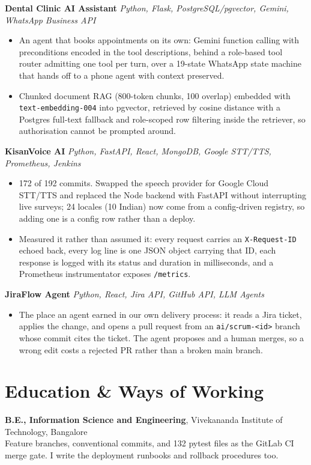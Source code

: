 \documentclass[10pt,a4paper]{article}
\begin{document}
\vspace{1pt}
\textbf{Dental Clinic AI Assistant} \textit{Python, Flask, PostgreSQL/pgvector, Gemini, WhatsApp Business API}
\begin{itemize}
  \item An agent that books appointments on its own: Gemini function calling with preconditions
        encoded in the tool descriptions, behind a role-based tool router admitting one tool per turn,
        over a 19-state WhatsApp state machine that hands off to a phone agent with context preserved.
  \item Chunked document RAG (800-token chunks, 100 overlap) embedded with
        \texttt{text-embedding-004} into pgvector, retrieved by cosine distance with a Postgres
        full-text fallback and role-scoped row filtering inside the retriever, so authorisation cannot
        be prompted around.
\end{itemize}

\vspace{1pt}
\textbf{KisanVoice AI} \textit{Python, FastAPI, React, MongoDB, Google STT/TTS, Prometheus, Jenkins}
\begin{itemize}
  \item 172 of 192 commits. Swapped the speech provider for Google Cloud STT/TTS and replaced the Node
        backend with FastAPI without interrupting live surveys; 24 locales (10 Indian) now come from a
        config-driven registry, so adding one is a config row rather than a deploy.
  \item Measured it rather than assumed it: every request carries an \texttt{X-Request-ID} echoed
        back, every log line is one JSON object carrying that ID, each response is logged with its
        status and duration in milliseconds, and a Prometheus instrumentator exposes
        \texttt{/metrics}.
\end{itemize}

\vspace{1pt}
\textbf{JiraFlow Agent} \textit{Python, React, Jira API, GitHub API, LLM Agents}
\begin{itemize}
  \item The place an agent earned in our own delivery process: it reads a Jira ticket, applies the
        change, and opens a pull request from an \texttt{ai/scrum-<id>} branch whose commit cites the
        ticket. The agent proposes and a human merges, so a wrong edit costs a rejected PR rather than
        a broken main branch.
\end{itemize}

\section{Education \& Ways of Working}
\textbf{B.E., Information Science and Engineering}, Vivekananda Institute of Technology, Bangalore\\
Feature branches, conventional commits, and 132 pytest files as the GitLab CI merge gate. I write the
deployment runbooks and rollback procedures too.
\end{document}
